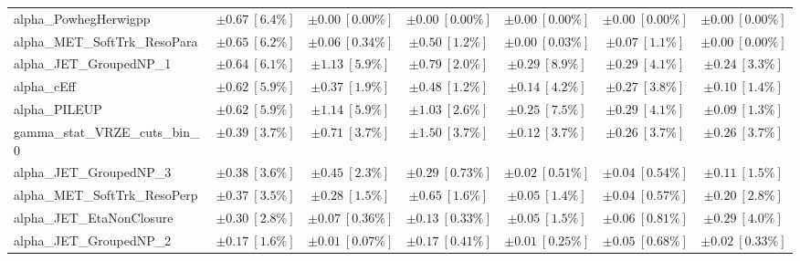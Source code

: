 \begin{sidewaystable}
\begin{center}
\begin{tabular*}{\textwidth}{@{\extracolsep{\fill}}lcccccc}
alpha\_PowhegHerwigpp         & $\pm 0.67\ [6.4\%] $          & $\pm 0.00\ [0.00\%] $          & $\pm 0.00\ [0.00\%] $          & $\pm 0.00\ [0.00\%] $          & $\pm 0.00\ [0.00\%] $          & $\pm 0.00\ [0.00\%] $       \\
alpha\_MET\_SoftTrk\_ResoPara         & $\pm 0.65\ [6.2\%] $          & $\pm 0.06\ [0.34\%] $          & $\pm 0.50\ [1.2\%] $          & $\pm 0.00\ [0.03\%] $          & $\pm 0.07\ [1.1\%] $          & $\pm 0.00\ [0.00\%] $       \\
alpha\_JET\_GroupedNP\_1         & $\pm 0.64\ [6.1\%] $          & $\pm 1.13\ [5.9\%] $          & $\pm 0.79\ [2.0\%] $          & $\pm 0.29\ [8.9\%] $          & $\pm 0.29\ [4.1\%] $          & $\pm 0.24\ [3.3\%] $       \\
alpha\_cEff         & $\pm 0.62\ [5.9\%] $          & $\pm 0.37\ [1.9\%] $          & $\pm 0.48\ [1.2\%] $          & $\pm 0.14\ [4.2\%] $          & $\pm 0.27\ [3.8\%] $          & $\pm 0.10\ [1.4\%] $       \\
alpha\_PILEUP         & $\pm 0.62\ [5.9\%] $          & $\pm 1.14\ [5.9\%] $          & $\pm 1.03\ [2.6\%] $          & $\pm 0.25\ [7.5\%] $          & $\pm 0.29\ [4.1\%] $          & $\pm 0.09\ [1.3\%] $       \\
gamma\_stat\_VRZE\_cuts\_bin\_0         & $\pm 0.39\ [3.7\%] $          & $\pm 0.71\ [3.7\%] $          & $\pm 1.50\ [3.7\%] $          & $\pm 0.12\ [3.7\%] $          & $\pm 0.26\ [3.7\%] $          & $\pm 0.26\ [3.7\%] $       \\
alpha\_JET\_GroupedNP\_3         & $\pm 0.38\ [3.6\%] $          & $\pm 0.45\ [2.3\%] $          & $\pm 0.29\ [0.73\%] $          & $\pm 0.02\ [0.51\%] $          & $\pm 0.04\ [0.54\%] $          & $\pm 0.11\ [1.5\%] $       \\
alpha\_MET\_SoftTrk\_ResoPerp         & $\pm 0.37\ [3.5\%] $          & $\pm 0.28\ [1.5\%] $          & $\pm 0.65\ [1.6\%] $          & $\pm 0.05\ [1.4\%] $          & $\pm 0.04\ [0.57\%] $          & $\pm 0.20\ [2.8\%] $       \\
alpha\_JET\_EtaNonClosure         & $\pm 0.30\ [2.8\%] $          & $\pm 0.07\ [0.36\%] $          & $\pm 0.13\ [0.33\%] $          & $\pm 0.05\ [1.5\%] $          & $\pm 0.06\ [0.81\%] $          & $\pm 0.29\ [4.0\%] $       \\
alpha\_JET\_GroupedNP\_2         & $\pm 0.17\ [1.6\%] $          & $\pm 0.01\ [0.07\%] $          & $\pm 0.17\ [0.41\%] $          & $\pm 0.01\ [0.25\%] $          & $\pm 0.05\ [0.68\%] $          & $\pm 0.02\ [0.33\%] $       \\

\end{tabular*}
\end{center}
\end{sidewaystable}
